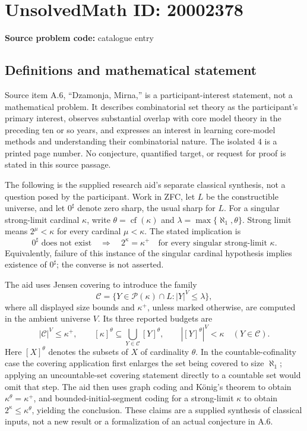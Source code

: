 \documentclass[11pt]{article}
\begin{document}
\section*{UnsolvedMath ID: 20002378}
\textbf{Source problem code:} catalogue entry
\subsection{Definitions and mathematical statement}
Source item A.6, ``Dzamonja, Mirna,'' is a participant-interest statement, not a mathematical problem. It describes combinatorial set theory as the participant's primary interest, observes substantial overlap with core model theory in the preceding ten or so years, and expresses an interest in learning core-model methods and understanding their combinatorial nature. The isolated $4$ is a printed page number. No conjecture, quantified target, or request for proof is stated in this source passage.

The following is the supplied research aid's separate classical synthesis, not a question posed by the participant. Work in ZFC, let $L$ be the constructible universe, and let $0^\sharp$ denote zero sharp, the usual sharp for $L$. For a singular strong-limit cardinal $\kappa$, write $\theta=\operatorname{cf}(\kappa)$ and $\lambda=\max\{\aleph_1,\theta\}$. Strong limit means $2^\mu<\kappa$ for every cardinal $\mu<\kappa$. The stated implication is
\[
0^\sharp\text{ does not exist}\quad\Longrightarrow\quad
2^\kappa=\kappa^+\quad\text{for every singular strong-limit }\kappa.
\]
Equivalently, failure of this instance of the singular cardinal hypothesis implies existence of $0^\sharp$; the converse is not asserted.

The aid uses Jensen covering to introduce the family
\[
\mathcal C=\{Y\in\mathcal P(\kappa)\cap L:|Y|^V\leq\lambda\},
\]
where all displayed size bounds and $\kappa^+$, unless marked otherwise, are computed in the ambient universe $V$. Its three reported budgets are
\[
|\mathcal C|^V\leq\kappa^+,\qquad
[\kappa]^\theta\subseteq\bigcup_{Y\in\mathcal C}[Y]^\theta,\qquad
|[Y]^\theta|^V<\kappa\quad(Y\in\mathcal C).
\]
Here $[X]^\theta$ denotes the subsets of $X$ of cardinality $\theta$. In the countable-cofinality case the covering application first enlarges the set being covered to size $\aleph_1$; applying an uncountable-set covering statement directly to a countable set would omit that step. The aid then uses graph coding and K\"onig's theorem to obtain $\kappa^\theta=\kappa^+$, and bounded-initial-segment coding for a strong-limit $\kappa$ to obtain $2^\kappa\leq\kappa^\theta$, yielding the conclusion. These claims are a supplied synthesis of classical inputs, not a new result or a formalization of an actual conjecture in A.6.
\end{document}
